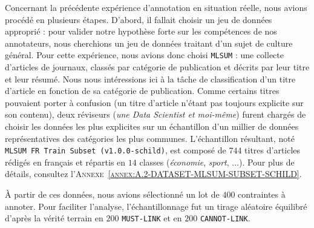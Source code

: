 			Concernant la précédente expérience d'annotation en situation réelle, nous avions procédé en plusieurs étapes.
			D'abord, il fallait choisir un jeu de données approprié : pour valider notre hypothèse forte sur les compétences de nos annotateurs, nous cherchions un jeu de données traitant d'un sujet de culture général.
			Pour cette expérience, nous avions donc choisi \texttt{MLSUM} : une collecte d'articles de journaux, classés par catégorie de publication et décrits par leur titre et leur résumé.
			Nous nous intéressions ici à la tâche de classification d'un titre d'article en fonction de sa catégorie de publication.
			Comme certains titres pouvaient porter à confusion (un titre d'article n'étant pas toujours explicite sur son contenu), deux réviseurs (\textit{une Data Scientist et moi-même}) furent chargés de choisir les données les plus explicites sur un échantillon d'un millier de données représentatives des catégories les plus communes.
			L'échantillon résultant, noté \texttt{MLSUM FR Train Subset (v1.0.0-schild)}, est composé de $744$ titres d'articles rédigés en français et répartis en $14$ classes (\textit{économie}, \textit{sport}, ...).
			Pour plus de détails, consultez l'\textsc{Annexe~\ref{annex:A.2-DATASET-MLSUM-SUBSET-SCHILD}}.
		
			À partir de ces données, nous avions sélectionné un lot de $400$ contraintes à annoter.
			Pour faciliter l'analyse, l'échantillonnage fut un tirage aléatoire équilibré d'après la vérité terrain en $200$ \texttt{MUST-LINK} et en $200$ \texttt{CANNOT-LINK}.
			
